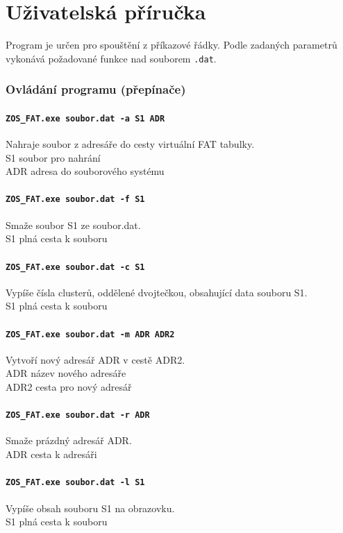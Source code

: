 \documentclass[12pt]{article}
\begin{document}
\section{Uživatelská příručka}
Program je určen pro spouštění z příkazové řádky. Podle zadaných parametrů vykonává požadované funkce nad souborem \texttt{.dat}.

\subsubsection{Ovládání programu (přepínače)}

\paragraph{\texttt{ZOS\_FAT.exe soubor.dat -a S1 ADR}}
Nahraje soubor z adresáře do cesty virtuální FAT tabulky.
\\S1 soubor pro nahrání
\\ADR adresa do souborového systému

\paragraph{\texttt{ZOS\_FAT.exe soubor.dat -f S1}}
Smaže soubor S1 ze soubor.dat.
\\S1 plná cesta k souboru 

\paragraph{\texttt{ZOS\_FAT.exe soubor.dat -c S1}}
Vypíše čísla clusterů, oddělené dvojtečkou, obsahující data souboru S1.
\\S1 plná cesta k souboru 

\paragraph{\texttt{ZOS\_FAT.exe soubor.dat -m ADR ADR2}}
Vytvoří nový adresář ADR v cestě ADR2.
\\ADR název nového adresáře
\\ADR2 cesta pro nový adresář

\paragraph{\texttt{ZOS\_FAT.exe soubor.dat -r ADR}}
Smaže prázdný adresář ADR.
\\ADR cesta k adresáři

\paragraph{\texttt{ZOS\_FAT.exe soubor.dat -l S1}}
Vypíše obsah souboru S1 na obrazovku.
\\S1 plná cesta k souboru
\end{document}
